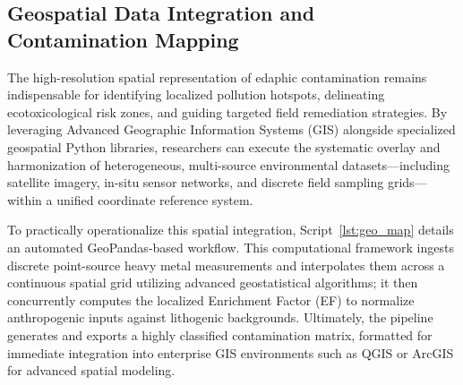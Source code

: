 \documentclass[land,article,submit,pdftex,moreauthors]{Definitions/mdpi}
\begin{document}
\subsection{Geospatial Data Integration and Contamination Mapping}\label{sec2.3}

The high-resolution spatial representation of edaphic contamination remains indispensable for identifying localized pollution hotspots, delineating ecotoxicological risk zones, and guiding targeted field remediation strategies. By leveraging Advanced Geographic Information Systems (GIS) alongside specialized geospatial Python libraries, researchers can execute the systematic overlay and harmonization of heterogeneous, multi-source environmental datasets—including satellite imagery, in-situ sensor networks, and discrete field sampling grids—within a unified coordinate reference system. 

To practically operationalize this spatial integration, Script~\ref{lst:geo_map} details an automated GeoPandas-based workflow. This computational framework ingests discrete point-source heavy metal measurements and interpolates them across a continuous spatial grid utilizing advanced geostatistical algorithms; it then concurrently computes the localized Enrichment Factor (EF) to normalize anthropogenic inputs against lithogenic backgrounds. Ultimately, the pipeline generates and exports a highly classified contamination matrix, formatted for immediate integration into enterprise GIS environments such as QGIS or ArcGIS for advanced spatial modeling.
\end{document}
